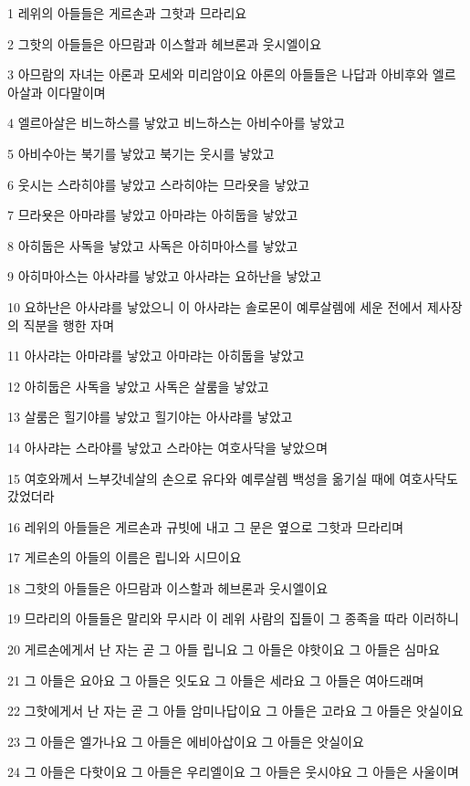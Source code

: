 \par 1 레위의 아들들은 게르손과 그핫과 므라리요
\par 2 그핫의 아들들은 아므람과 이스할과 헤브론과 웃시엘이요
\par 3 아므람의 자녀는 아론과 모세와 미리암이요 아론의 아들들은 나답과 아비후와 엘르아살과 이다말이며
\par 4 엘르아살은 비느하스를 낳았고 비느하스는 아비수아를 낳았고
\par 5 아비수아는 북기를 낳았고 북기는 웃시를 낳았고
\par 6 웃시는 스라히야를 낳았고 스라히야는 므라욧을 낳았고
\par 7 므라욧은 아마랴를 낳았고 아마랴는 아히둡을 낳았고
\par 8 아히둡은 사독을 낳았고 사독은 아히마아스를 낳았고
\par 9 아히마아스는 아사랴를 낳았고 아사랴는 요하난을 낳았고
\par 10 요하난은 아사랴를 낳았으니 이 아사랴는 솔로몬이 예루살렘에 세운 전에서 제사장의 직분을 행한 자며
\par 11 아사랴는 아마랴를 낳았고 아마랴는 아히둡을 낳았고
\par 12 아히둡은 사독을 낳았고 사독은 살룸을 낳았고
\par 13 살룸은 힐기야를 낳았고 힐기야는 아사랴를 낳았고
\par 14 아사랴는 스라야를 낳았고 스라야는 여호사닥을 낳았으며
\par 15 여호와께서 느부갓네살의 손으로 유다와 예루살렘 백성을 옮기실 때에 여호사닥도 갔었더라
\par 16 레위의 아들들은 게르손과 규빗에 내고 그 문은 옆으로 그핫과 므라리며
\par 17 게르손의 아들의 이름은 립니와 시므이요
\par 18 그핫의 아들들은 아므람과 이스할과 헤브론과 웃시엘이요
\par 19 므라리의 아들들은 말리와 무시라 이 레위 사람의 집들이 그 종족을 따라 이러하니
\par 20 게르손에게서 난 자는 곧 그 아들 립니요 그 아들은 야핫이요 그 아들은 심마요
\par 21 그 아들은 요아요 그 아들은 잇도요 그 아들은 세라요 그 아들은 여아드래며
\par 22 그핫에게서 난 자는 곧 그 아들 암미나답이요 그 아들은 고라요 그 아들은 앗실이요
\par 23 그 아들은 엘가나요 그 아들은 에비아삽이요 그 아들은 앗실이요
\par 24 그 아들은 다핫이요 그 아들은 우리엘이요 그 아들은 웃시야요 그 아들은 사울이며
